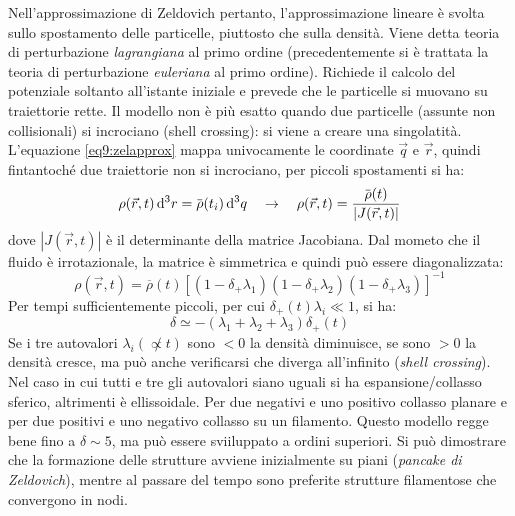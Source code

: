 Nell'approssimazione di Zeldovich pertanto, l'approssimazione lineare è svolta sullo spostamento delle particelle, piuttosto che sulla densità. Viene detta teoria di perturbazione \textit{lagrangiana} al primo ordine (precedentemente si è trattata la teoria di perturbazione \textit{euleriana} al primo ordine). Richiede il calcolo del potenziale soltanto all'istante iniziale e prevede che le particelle si muovano su traiettorie rette. Il modello non è più esatto quando due particelle (assunte non collisionali) si incrociano (shell crossing): si viene a creare una singolatità. L'equazione \ref{eq9:zelapprox} mappa univocamente le coordinate $\vec{q}$ e $\vec{r}$, quindi fintantoché due traiettorie non si incrociano, per piccoli spostamenti si ha:
\begin{equation}
    \rho(\vec{r},t)\d{^3r}=\overbar{\rho} (t_i) \d{^3q} \quad \rightarrow \quad \rho(\vec{r},t) = \frac{\overbar{\rho} (t)}{|J(\vec{r},t)|}
\end{equation}
dove $|J(\vec{r},t)|$ è il determinante della matrice Jacobiana. Dal mometo che il fluido è irrotazionale, la matrice è simmetrica e quindi può essere diagonalizzata:
\begin{equation}
    \rho(\vec{r},t)=\overbar{\rho} (t) \left[\left(1-\delta_+ \lambda_1\right)\left(1-\delta_+ \lambda_2\right)\left(1-\delta_+ \lambda_3\right)\right]^{-1}
\end{equation}
Per tempi sufficientemente piccoli, per cui $\delta_+ (t)\lambda_i\ll 1$, si ha:
\begin{equation}
    \delta\simeq -\left(\lambda_1 + \lambda_2 + \lambda_3\right)\delta_+(t)
\end{equation}
Se i tre autovalori $\lambda_i (\not\propto t)$ sono $<0$ la densità diminuisce, se sono $>0$ la densità cresce, ma può anche verificarsi che diverga all'infinito (\textit{shell crossing}). Nel caso in cui tutti e tre gli autovalori siano uguali si ha espansione/collasso sferico, altrimenti è ellissoidale. Per due negativi e uno positivo collasso planare e per due positivi e uno negativo collasso su un filamento. Questo modello regge bene fino a $\delta\sim 5$, ma può essere sviiluppato a ordini superiori. 
Si può dimostrare che la formazione delle strutture avviene inizialmente su piani (\textit{pancake di Zeldovich}), mentre al passare del tempo sono preferite strutture filamentose che convergono in nodi. 

